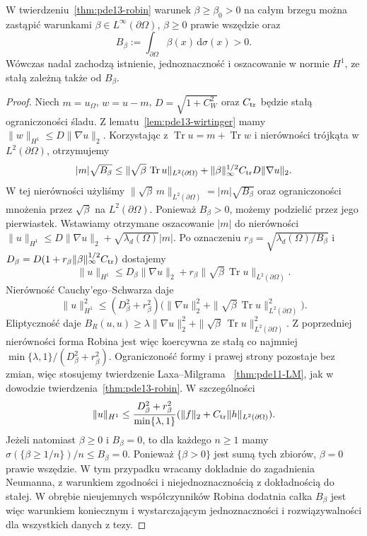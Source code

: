 \begin{wniosek}
\label{cor:pde13-robin-partial}
W twierdzeniu~\ref{thm:pde13-robin} warunek
$\beta\ge\beta_0>0$ na całym brzegu można zastąpić
warunkami $\beta\in L^\infty(\partial\Omega)$, $\beta\ge0$
prawie wszędzie oraz
\[
 B_\beta:=\int_{\partial\Omega}\beta(x)\,\mathrm d\sigma(x)>0.
\]
Wówczas nadal zachodzą istnienie, jednoznaczność i oszacowanie
w normie $H^1$, ze stałą zależną także od $B_\beta$.
\end{wniosek}
\begin{proof}
Niech $m=u_\Omega$, $w=u-m$, $D=\sqrt{1+C_W^2}$ oraz
$C_{\rm tr}$ będzie stałą ograniczoności śladu.
Z lematu~\ref{lem:pde13-wirtinger} mamy
$\|w\|_{H^1}\le D\|\nabla u\|_2$.
Korzystając z $\operatorname{Tr}u=m+\operatorname{Tr}w$
i nierówności trójkąta w $L^2(\partial\Omega)$, otrzymujemy
\[
 |m|\sqrt{B_\beta}\le
 \|\sqrt\beta\,\operatorname{Tr}u\|_{L^2(\partial\Omega)}
 +\|\beta\|_\infty^{1/2}C_{\rm tr}D\|\nabla u\|_2.
\]
W tej nierówności użyliśmy
$\|\sqrt\beta\,m\|_{L^2(\partial\Omega)}
=|m|\sqrt{B_\beta}$ oraz ograniczoności mnożenia
przez $\sqrt\beta$ na $L^2(\partial\Omega)$.
Ponieważ $B_\beta>0$, możemy podzielić przez jego pierwiastek.
Wstawiamy otrzymane oszacowanie $|m|$ do nierówności
$\|u\|_{H^1}\le D\|\nabla u\|_2+\sqrt{\lambda_d(\Omega)}|m|$.
Po oznaczeniu $r_\beta=\sqrt{\lambda_d(\Omega)/B_\beta}$
i $D_\beta=D(1+r_\beta\|\beta\|_\infty^{1/2}C_{\rm tr})$
dostajemy
\[
 \|u\|_{H^1}\le D_\beta\|\nabla u\|_2+
 r_\beta\|\sqrt\beta\,\operatorname{Tr}u\|_{L^2(\partial\Omega)}.
\]
Nierówność Cauchy'ego--Schwarza daje
\[
 \|u\|_{H^1}^2\le (D_\beta^2+r_\beta^2)
 \bigl(\|\nabla u\|_2^2+
 \|\sqrt\beta\,\operatorname{Tr}u\|_{L^2(\partial\Omega)}^2\bigr).
\]
Eliptyczność daje
$B_R(u,u)\ge\lambda\|\nabla u\|_2^2+
\|\sqrt\beta\,\operatorname{Tr}u\|_{L^2(\partial\Omega)}^2$.
Z poprzedniej nierówności forma Robina jest więc koercywna
ze stałą co najmniej $\min\{\lambda,1\}/(D_\beta^2+r_\beta^2)$.
Ograniczoność formy i prawej strony pozostaje bez zmian,
więc stosujemy twierdzenie Laxa--Milgrama
~\ref{thm:pde11-LM}, jak w dowodzie
twierdzenia~\ref{thm:pde13-robin}. W szczególności
\[
 \|u\|_{H^1}\le
 \frac{D_\beta^2+r_\beta^2}{\min\{\lambda,1\}}
 (\|f\|_2+C_{\rm tr}\|h\|_{L^2(\partial\Omega)}).
\]
Jeżeli natomiast $\beta\ge0$ i $B_\beta=0$, to dla każdego
$n\ge1$ mamy $\sigma(\{\beta\ge1/n\})/n\le B_\beta=0$.
Ponieważ $\{\beta>0\}$ jest sumą tych zbiorów,
$\beta=0$ prawie wszędzie. W tym przypadku wracamy dokładnie do
zagadnienia Neumanna, z warunkiem zgodności i niejednoznacznością
z dokładnością do stałej. W obrębie nieujemnych współczynników
Robina dodatnia całka $B_\beta$ jest więc warunkiem koniecznym
i wystarczającym jednoznaczności i rozwiązywalności dla wszystkich
danych z tezy.
\end{proof}

